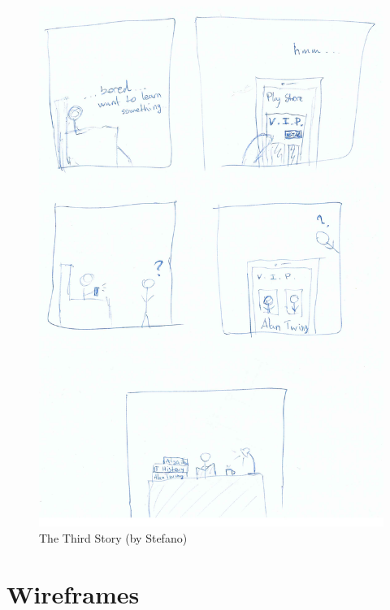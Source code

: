 \documentclass[12pt]{scrartcl}
\begin{document}
	\begin{figure}[H]
        		\centering
       		\includegraphics[width=\textwidth]{../images/story3.jpg}
       		\caption{The Third Story (by Stefano)}
        		\label{story3}
	\end{figure}
	

\section{Wireframes}

	
\end{document}
